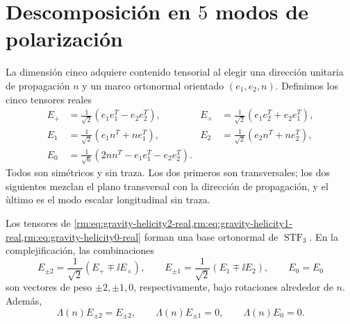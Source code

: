 \section{Descomposición en \(5\) modos de polarización}

La dimensi\'on cinco adquiere contenido tensorial al elegir una direcci\'on
unitaria de propagaci\'on \(n\) y un marco ortonormal orientado
\((e_1,e_2,n)\). Definimos los cinco tensores reales
\begin{align}
E_{+}&=\frac1{\sqrt2}(e_1e_1^T-e_2e_2^T),
&E_{\times}&=\frac1{\sqrt2}(e_1e_2^T+e_2e_1^T),
\label{rm:eq:gravity-helicity2-real}\\
E_{1}&=\frac1{\sqrt2}(e_1n^T+ne_1^T),
&E_{2}&=\frac1{\sqrt2}(e_2n^T+ne_2^T),
\label{rm:eq:gravity-helicity1-real}\\
E_{0}&=\frac1{\sqrt6}(2nn^T-e_1e_1^T-e_2e_2^T).
\label{rm:eq:gravity-helicity0-real}
\end{align}
Todos son sim\'etricos y sin traza. Los dos primeros son transversales; los
dos siguientes mezclan el plano transversal con la direcci\'on de
propagaci\'on, y el \`ultimo es el modo escalar longitudinal sin traza.

\begin{theorem}
\label{rm:thm:gravity-five-helicities}
Los tensores de
\cref{rm:eq:gravity-helicity2-real,rm:eq:gravity-helicity1-real,rm:eq:gravity-helicity0-real}
forman una base ortonormal de \(\operatorname{STF}_3\). En la
complejificaci\'on, las combinaciones
\begin{equation}
\label{rm:eq:gravity-complex-helicities}
E_{\pm2}=\frac1{\sqrt2}(E_+\mp\ii E_\times),
\qquad
E_{\pm1}=\frac1{\sqrt2}(E_1\mp\ii E_2),
\qquad E_0=E_0
\end{equation}
son vectores de peso \(\pm2,\pm1,0\), respectivamente, bajo rotaciones
alrededor de \(n\). Adem\'as,
\begin{equation}
\label{rm:eq:gravity-tt-on-five}
\Lambda(n)E_{\pm2}=E_{\pm2},
\qquad
\Lambda(n)E_{\pm1}=0,
\qquad
\Lambda(n)E_0=0.
\end{equation}
\end{theorem}

